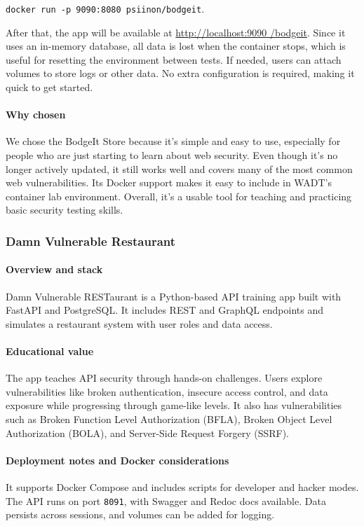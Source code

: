 \documentclass[12pt,titlepage]{article}
\begin{document}
\texttt{docker run -p 9090:8080 psiinon/bodgeit}.

After that, the app will be available at \url{http://localhost:9090
/bodgeit}. Since it uses an in-memory database, all data is lost when the container stops, which is useful for resetting the environment between tests. If needed, users can attach volumes to store logs or other data. No extra configuration is required, making it quick to get started.

\paragraph{Why chosen}
We chose the BodgeIt Store because it’s simple and easy to use, especially for people who are just starting to learn about web security. Even though it’s no longer actively updated, it still works well and covers many of the most common web vulnerabilities. Its Docker support makes it easy to include in WADT’s container lab environment. Overall, it’s a usable tool for teaching and practicing basic security testing skills.

\subsubsection{Damn Vulnerable Restaurant}

\paragraph{Overview and stack}
Damn Vulnerable RESTaurant is a Python-based API training app built with FastAPI and PostgreSQL. It includes REST and GraphQL endpoints and simulates a restaurant system with user roles and data access.

\paragraph{Educational value}
The app teaches API security through hands-on challenges. Users explore vulnerabilities like broken authentication, insecure access control, and data exposure while progressing through game-like levels. It also has vulnerabilities such as Broken Function Level Authorization (BFLA), Broken Object Level Authorization (BOLA), and Server-Side Request Forgery (SSRF).

\paragraph{Deployment notes and Docker considerations}
It supports Docker Compose and includes scripts for developer and hacker modes. The API runs on port \texttt{8091}, with Swagger and Redoc docs available. Data persists across sessions, and volumes can be added for logging.
\end{document}

